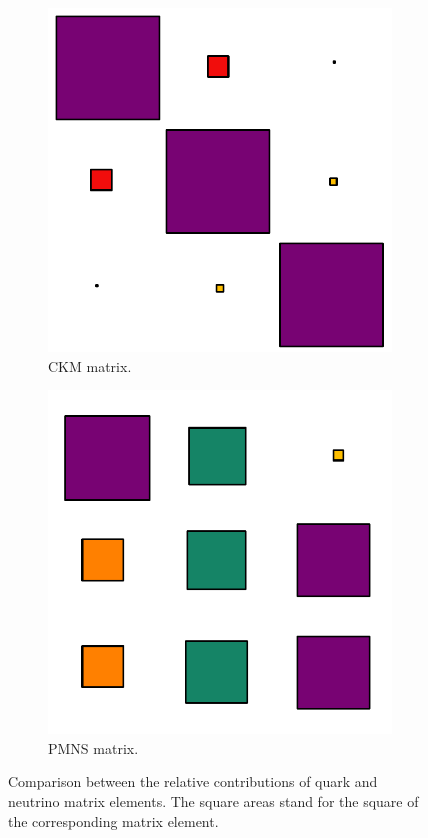 \begin{figure}[h]
  \centering
  \begin{subfigure}[t]{0.48\textwidth}
    \centering
    \includegraphics[height=0.7\textwidth]{neutrinophysics/fig_neutrinophysics/ckm_draw.pdf}
    \captionsetup{justification=justified}
    \caption{CKM matrix.
      \label{subfig:ckm}}
  \end{subfigure}
  \hfill
  \begin{subfigure}[t]{0.48\textwidth}
    \centering
    \includegraphics[height=0.7\textwidth]{neutrinophysics/fig_neutrinophysics/upmns_draw.pdf}
    \captionsetup{justification=justified}
    \caption{PMNS matrix.
      \label{subfig:pmns}}
  \end{subfigure}
  \caption{Comparison between the relative contributions of quark and neutrino matrix elements.
    The square areas stand for the square of the corresponding matrix element.
    \label{fig:ckm_pmns}
  }
\end{figure}


